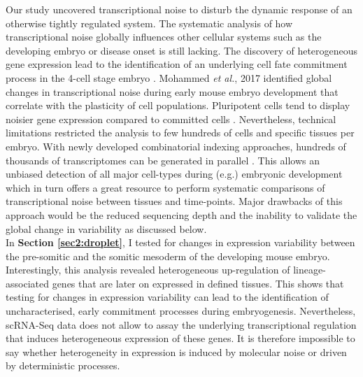 Our study uncovered transcriptional noise to disturb the dynamic response of an otherwise tightly regulated system. The systematic analysis of how transcriptional noise globally influences other cellular systems such as the developing embryo or disease onset is still lacking. The discovery of heterogeneous gene expression lead to the identification of an underlying cell fate commitment process in the 4-cell stage embryo \citep{Goolam2016}. Mohammed \emph{et al.}, 2017 identified global changes in transcriptional noise during early mouse embryo development that correlate with the plasticity of cell populations. Pluripotent cells tend to display noisier gene expression compared to committed cells \citep{Mohammed2017}. Nevertheless, technical limitations restricted the analysis to few hundreds of cells and specific tissues per embryo. With newly developed combinatorial indexing approaches, hundreds of thousands of transcriptomes can be generated in parallel \citep{Cao2017}. This allows an unbiased detection of all major cell-types during (e.g.) embryonic development which in turn offers a great resource to perform systematic comparisons of transcriptional noise between tissues and time-points. Major drawbacks of this approach would be the reduced sequencing depth and the inability to validate the global change in variability as discussed below.\\

In \textbf{Section \ref{sec2:droplet}}, I tested for changes in expression variability between the pre-somitic and the somitic mesoderm of the developing mouse embryo. Interestingly, this analysis revealed heterogeneous up-regulation of lineage-associated genes that are later on expressed in defined tissues. This shows that testing for changes in expression variability can lead to the identification of uncharacterised, early commitment processes during embryogenesis. Nevertheless, scRNA-Seq data does not allow to assay the underlying transcriptional regulation that induces heterogeneous expression of these genes. It is therefore impossible to say whether heterogeneity in expression is induced by molecular noise or driven by deterministic processes.\\

